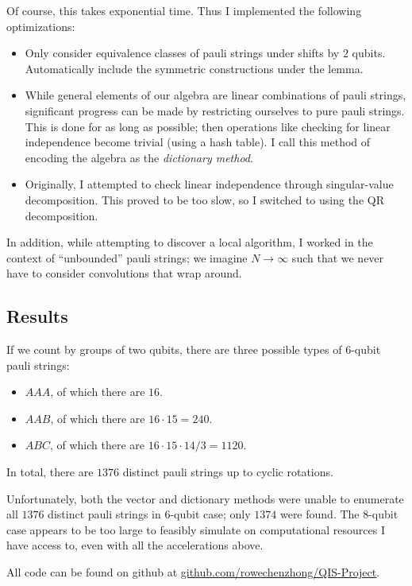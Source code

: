 \documentclass[fleqn,12pt]{article}
\begin{document}
Of course, this takes exponential time. Thus I implemented the following optimizations:
\begin{itemize}
    \item Only consider equivalence classes of pauli strings under shifts by $2$ qubits.
          Automatically include the symmetric constructions under the lemma.
    \item While general elements of our algebra are linear combinations of pauli
          strings, significant progress can be made by restricting ourselves to pure
          pauli strings. This is done for as long as possible;
          then operations like checking for linear independence become trivial
          (using a hash table). I call this method of encoding the algebra
          as the \emph{dictionary method}.
    \item Originally, I attempted to check linear independence through singular-value
          decomposition. This proved to be too slow, so I switched to using the QR decomposition.
\end{itemize}

In addition, while attempting to discover a local algorithm, I worked
in the context of ``unbounded'' pauli strings; we imagine $N\to \infty$
such that we never have to consider convolutions that wrap around.

\subsection{Results}

If we count by groups of two qubits, there are three possible types
of $6$-qubit pauli strings:
\begin{itemize}
    \item $AAA$, of which there are $16$.
    \item $AAB$, of which there are $16 \cdot 15 = 240$.
    \item $ABC$, of which there are $16 \cdot 15 \cdot 14 / 3 = 1120$.
\end{itemize}
In total, there are $1376$ distinct pauli
strings up to cyclic rotations.

Unfortunately, both the vector and dictionary methods were unable
to enumerate all $1376$ distinct pauli strings in $6$-qubit case; only $1374$
were found. The $8$-qubit case appears to be too large to
feasibly simulate on computational resources I have access to,
even with all the accelerations above.

All code can be found on github at
\href{https://github.com/rowechenzhong/QIS-Project}{github.com/rowechenzhong/QIS-Project}.
\end{document}
